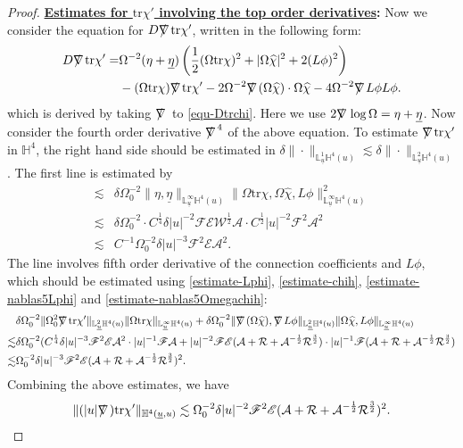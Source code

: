 \documentclass[11pt,reqno]{amsart}
\theoremstyle{definition}
\numberwithin{equation}{section}
\newcommand{\tr}{\mathrm{tr}}
\renewcommand{\L}{\mathbb{L}}
\renewcommand{\H}{\mathbb{H}}
\def\chih{\widehat{\chi}}
\def\etab{\underline{\eta}}
\def\tr{\mathrm{tr}}
\def\ub{\underline{u}}
\def\nablas{\mbox{$\nabla \mkern -13mu /$ }}
\begin{document}
\begin{proof}
{\bf \underline{Estimates for $\tr\chi'$ involving the top order derivatives}:} Now we consider the equation for $D\nablas\tr\chi'$, written in the following form:
\begin{equation}\label{equ-Dnablastrchi}
\begin{split}
D\nablas\tr\chi'=&\Omega^{-2}(\eta+\etab)\left(\frac{1}{2}(\Omega\tr\chi)^2+|\Omega\chih|^2+2(L\phi)^2\right)\\
&-(\Omega\tr\chi)\nablas\tr\chi'-2\Omega^{-2}\nablas(\Omega\chih)\cdot\Omega\chih-4\Omega^{-2}\nablas L\phi L\phi.
\end{split}
\end{equation}
which is derived by taking $\nablas$ to \eqref{equ-Dtrchi}. Here we use $2\nablas\log\Omega=\eta+\etab$. Now consider the fourth order derivative $\nablas^4$ of the above equation. To estimate $\nablas\tr\chi'$ in $\H^4$, the right hand side should be estimated in $\delta\|\cdot\|_{\L^1_{\ub}\H^4(u)}\lesssim\delta\|\cdot\|_{\L^2_{\ub}\H^4(u)}$. The first line is estimated by
\begin{align*}
\lesssim&\delta\Omega_0^{-2}\|\eta,\etab\|_{\L^\infty_{\ub}\H^4(u)}\|\Omega\tr\chi,\Omega\chih,L\phi\|_{\L^\infty_{\ub}\H^4(u)}^2\\
\lesssim&\delta\Omega_0^{-2}\cdot C^{\frac{1}{4}}\delta|u|^{-2}\mathscr{F}\mathscr{E}\mathscr{W}^{\frac{1}{2}}\mathcal{A}\cdot C^{\frac{1}{2}}|u|^{-2}\mathscr{F}^2\mathcal{A}^2\\
\lesssim&C^{-1}\Omega_0^{-2}\delta|u|^{-3}\mathscr{F}^2\mathscr{E}\mathcal{A}^2.
\end{align*}
The  line involves fifth order derivative of the connection coefficients and $L\phi$, which should be estimated using \eqref{estimate-Lphi}, \eqref{estimate-chih}, \eqref{estimate-nablas5Lphi} and \eqref{estimate-nablas5Omegachih}:
\begin{align*}
&\delta\Omega_0^{-2}\|\Omega_0^2\nablas\tr\chi'\|_{\L^2_{\ub}\H^4(u)}\|\Omega\tr\chi\|_{\L^\infty_{\ub}\H^4(u)}+\delta\Omega_0^{-2}\|\nablas(\Omega\chih),\nablas L\phi\|_{\L^2_{\ub}\H^4(u)}\|\Omega\chih,L\phi\|_{\L^\infty_{\ub}\H^4(u)}\\
\lesssim&\delta\Omega_0^{-2}(C^{\frac{1}{4}}\delta|u|^{-3}\mathscr{F}^2\mathscr{E}\mathcal{A}^2\cdot|u|^{-1}\mathscr{F}\mathcal{A}+|u|^{-2}\mathscr{F}\mathscr{E}(\mathcal{A}+\mathcal{R}+\mathcal{A}^{-\frac{1}{2}}\mathcal{R}^{\frac{3}{2}})\cdot|u|^{-1}\mathscr{F}(\mathcal{A}+\mathcal{R}+\mathcal{A}^{-\frac{1}{2}}\mathcal{R}^{\frac{3}{2}})\\\lesssim&\Omega_0^{-2}\delta|u|^{-3}\mathscr{F}^2\mathscr{E}(\mathcal{A}+\mathcal{R}+\mathcal{A}^{-\frac{1}{2}}\mathcal{R}^{\frac{3}{2}})^2.
\end{align*}
Combining the above estimates, we have
\begin{align}\label{estimate-nablas5trchi}
\|(|u|\nablas)\tr\chi'\|_{\H^4(\ub,u)}\lesssim\Omega_0^{-2}\delta|u|^{-2}\mathscr{F}^2\mathscr{E}(\mathcal{A}+\mathcal{R}+\mathcal{A}^{-\frac{1}{2}}\mathcal{R}^{\frac{3}{2}})^2.
\end{align}


\end{proof}
\end{document}
